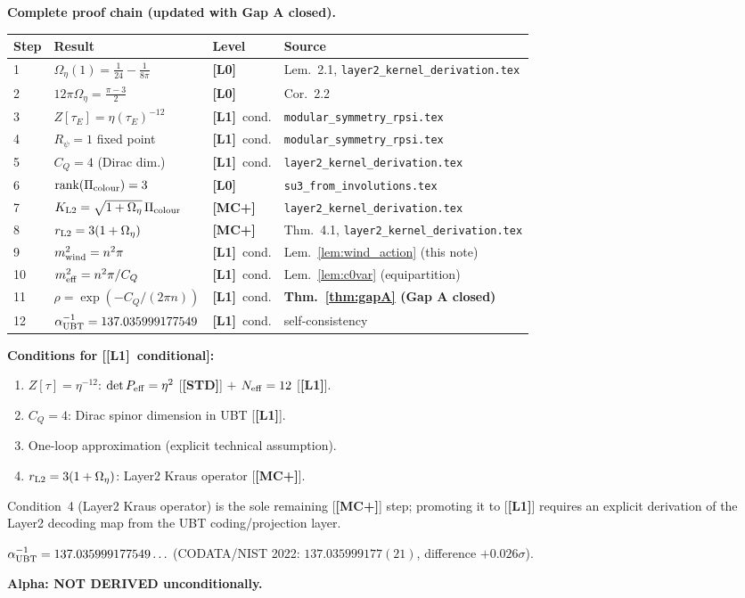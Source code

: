 \documentclass[12pt,a4paper]{article}
\theoremstyle{definition}\newtheorem{definition}[theorem]{Definition}
\theoremstyle{remark}\newtheorem{remark}[theorem]{Remark}
\newcommand{\Lz}{\textbf{[L0]}}
\newcommand{\Lo}{\textbf{[L1]}}
\newcommand{\MCp}{\textbf{[MC+]}}
\newcommand{\STD}{\textbf{[STD]}}
\begin{document}
\begin{resultbox}
\textbf{Complete proof chain (updated with Gap A closed).}

\begin{center}
\renewcommand{\arraystretch}{1.35}
\begin{tabular}{llll}
\toprule
Step & Result & Level & Source \\
\midrule
1 & $\Omega_\eta(1) = \tfrac{1}{24}-\tfrac{1}{8\pi}$ & \Lz & Lem.~2.1, \texttt{layer2\_kernel\_derivation.tex} \\
2 & $12\pi\Omega_\eta = \tfrac{\pi-3}{2}$ & \Lz & Cor.~2.2 \\
3 & $Z[\tau_E]=\eta(\tau_E)^{-12}$ & \Lo\ cond. & \texttt{modular\_symmetry\_rpsi.tex} \\
4 & $R_\psi=1$ fixed point & \Lo\ cond. & \texttt{modular\_symmetry\_rpsi.tex} \\
5 & $C_Q=4$ (Dirac dim.) & \Lo\ cond. & \texttt{layer2\_kernel\_derivation.tex} \\
6 & $\mathrm{rank}(\Pi_{\rm colour})=3$ & \Lz & \texttt{su3\_from\_involutions.tex} \\
7 & $K_{\rm L2}=\sqrt{1+\Omega_\eta}\,\Pi_{\rm colour}$ & \MCp & \texttt{layer2\_kernel\_derivation.tex} \\
8 & $r_{\rm L2}=3(1+\Omega_\eta)$ & \MCp & Thm.~4.1, \texttt{layer2\_kernel\_derivation.tex} \\
9 & $m^2_{\rm wind}=n^2\pi$ & \Lo\ cond. & Lem.~\ref{lem:wind_action} (this note) \\
10 & $m^2_{\rm eff}=n^2\pi/C_Q$ & \Lo\ cond. & Lem.~\ref{lem:c0var} (equipartition) \\
11 & $\rho=\exp(-C_Q/(2\pi n))$ & \Lo\ cond. & \textbf{Thm.~\ref{thm:gapA} (Gap A closed)} \\
12 & $\alpha^{-1}_{\rm UBT}=137.035999177549$ & \Lo\ cond. & self-consistency \\
\bottomrule
\end{tabular}
\end{center}

\medskip
\textbf{Conditions for [\Lo\ conditional]:}
\begin{enumerate}
\item $Z[\tau]=\eta^{-12}$: $\det P_{\rm eff}=\eta^2$ [\STD] $+$
  $N_{\rm eff}=12$ [\Lo].
\item $C_Q=4$: Dirac spinor dimension in UBT [\Lo].
\item One-loop approximation (explicit technical assumption).
\item $r_{\rm L2}=3(1+\Omega_\eta)$: Layer2 Kraus operator [\MCp].
\end{enumerate}

Condition~4 (Layer2 Kraus operator) is the sole remaining [\MCp]
step; promoting it to [\Lo] requires an explicit derivation of
the Layer2 decoding map from the UBT coding/projection layer.

\medskip
$\alpha^{-1}_{\rm UBT} = 137.035999177549\ldots$\quad
(CODATA/NIST 2022: $137.035999177(21)$, difference $+0.026\sigma$).

\medskip
\textbf{Alpha: NOT DERIVED unconditionally.}
\end{resultbox}
\end{document}
